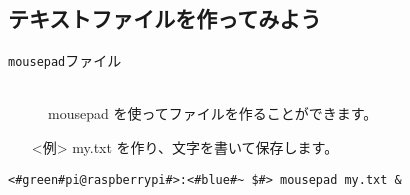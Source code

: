 \subsection{テキストファイルを作ってみよう}
\begin{description}
\item[\texttt{mousepad}\textvisiblespace ファイル]\mbox{}\\
mousepad を使ってファイルを作ることができます。
\end{description}
\begin{itemize}
\item[<例>]my.txt を作り、文字を書いて保存します。
\end{itemize}
\begin{lstlisting}[caption=mousepadの例, label=mousepad]
<#green#pi@raspberrypi#>:<#blue#~ $#> mousepad my.txt &
\end{lstlisting}
\begin{tcolorbox}[title=\useOmetoi]
\begin{enumerate}
\end{enumerate}
\end{tcolorbox}
